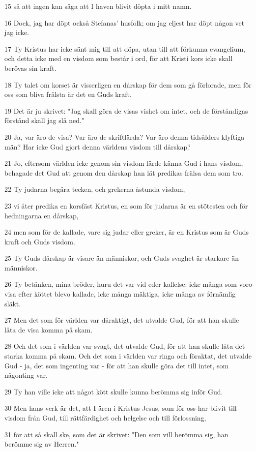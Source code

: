 \par 15 så att ingen kan säga att I haven blivit döpta i mitt namn.
\par 16 Dock, jag har döpt också Stefanas' husfolk; om jag eljest har döpt någon vet jag icke.
\par 17 Ty Kristus har icke sänt mig till att döpa, utan till att förkunna evangelium, och detta icke med en visdom som består i ord, för att Kristi kors icke skall berövas sin kraft.
\par 18 Ty talet om korset är visserligen en dårskap för dem som gå förlorade, men för oss som bliva frälsta är det en Guds kraft.
\par 19 Det är ju skrivet: "Jag skall göra de visas vishet om intet, och de förståndigas förstånd skall jag slå ned."
\par 20 Ja, var äro de visa? Var äro de skriftlärda? Var äro denna tidsålders klyftiga män? Har icke Gud gjort denna världens visdom till dårskap?
\par 21 Jo, eftersom världen icke genom sin visdom lärde känna Gud i hans visdom, behagade det Gud att genom den dårskap han lät predikas frälsa dem som tro.
\par 22 Ty judarna begära tecken, och grekerna åstunda visdom,
\par 23 vi åter predika en korsfäst Kristus, en som för judarna är en stötesten och för hedningarna en dårskap,
\par 24 men som för de kallade, vare sig judar eller greker, är en Kristus som är Guds kraft och Guds visdom.
\par 25 Ty Guds dårskap är visare än människor, och Guds svaghet är starkare än människor.
\par 26 Ty betänken, mina bröder, huru det var vid eder kallelse: icke många som voro visa efter köttet blevo kallade, icke många mäktiga, icke många av förnämlig släkt.
\par 27 Men det som för världen var dåraktigt, det utvalde Gud, för att han skulle låta de visa komma på skam.
\par 28 Och det som i världen var svagt, det utvalde Gud, för att han skulle låta det starka komma på skam. Och det som i världen var ringa och föraktat, det utvalde Gud - ja, det som ingenting var - för att han skulle göra det till intet, som någonting var.
\par 29 Ty han ville icke att något kött skulle kunna berömma sig inför Gud.
\par 30 Men hans verk är det, att I ären i Kristus Jesus, som för oss har blivit till visdom från Gud, till rättfärdighet och helgelse och till förlossning,
\par 31 för att så skall ske, som det är skrivet: "Den som vill berömma sig, han berömme sig av Herren."

